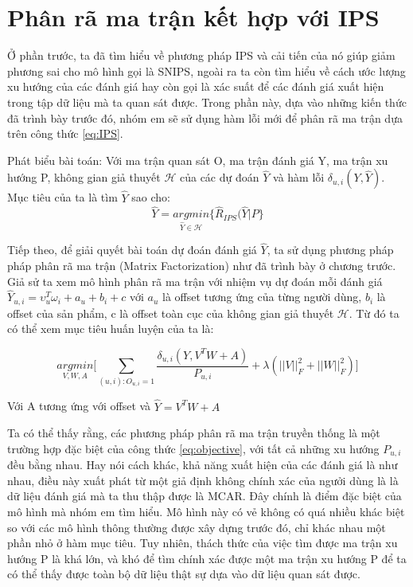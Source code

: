 \section{Phân rã ma trận kết hợp với IPS}
Ở phần trước, ta đã tìm hiểu về phương pháp IPS và cải tiến của nó giúp giảm phương sai cho mô hình gọi là SNIPS, ngoài ra ta còn tìm hiểu về cách ước lượng xu hướng của các đánh giá hay còn gọi là xác suất để các đánh giá xuất hiện trong tập dữ liệu mà ta quan sát được. Trong phần này, dựa vào những kiến thức đã trình bày trước đó, nhóm em sẽ sử dụng hàm lỗi mới để phân rã ma trận dựa trên công thức \ref{eq:IPS}. 

Phát biểu bài toán: Với ma trận quan sát O, ma trận đánh giá Y, ma trận xu hướng P, không gian giả thuyết $\mathcal{H}$ của các dự đoán $\hat{Y}$ và hàm lỗi $\delta_{u,i}(Y, \hat{Y})$. Mục tiêu của ta là tìm $\hat{Y}$ sao cho:
\begin{equation}
    \label{eq:ERM}
    \hat{Y} = \underset{\hat{Y} \in \mathcal{H}}{argmin}\bigg\{\hat{R}_{IPS}(\hat{Y}|P\bigg\}
\end{equation}

Tiếp theo, để giải quyết bài toán dự đoán đánh giá $\hat{Y}$, ta sử dụng phương pháp pháp phân rã ma trận (Matrix Factorization) như đã trình bày ở chương trước. Giả sử ta xem mô hình phân rã ma trận với nhiệm vụ dự đoán mỗi đánh giá $\hat{Y}_{u,i} = \upsilon_u^T \omega_i + a_u + b_i + c$ với $a_u$ là  offset tương ứng của từng người dùng, $b_i$ là offset của sản phẩm, c là offset toàn cục của không gian giả thuyết $\mathcal{H}$. Từ đó ta có thể xem mục tiêu huấn luyện của ta là:

\begin{equation}
    \label{eq:objective}
    \underset{V,W,A}{argmin} \bigg[ \sum_{(u,i):O_{u,i}=1} \frac{\delta_{u,i}(Y,V^TW + A)}{P_{u,i}} + \lambda(||V||_{F}^2 + ||W||_{F}^2) \Bigg]
\end{equation}

Với A tương ứng với offset và $\hat{Y} = V^TW + A$ 

Ta có thể thấy rằng, các phương pháp phân rã ma trận truyền thống là một trường hợp đặc biệt của công thức \ref{eq:objective}, với tất cả những xu hướng $P_{u,i}$ đều bằng nhau. Hay nói cách khác, khả năng xuất hiện của các đánh giá là như nhau, điều này xuất phát từ một giả định không chính xác của ngưởi dùng là là dữ liệu đánh giá mà ta thu thập được là MCAR. Đây chính là điểm đặc biệt của mô hình mà nhóm em tìm hiểu. Mô hình này có vẻ không có quá nhiều khác biệt so với các mô hình thông thường được xây dựng trước đó, chỉ khác nhau một phần nhỏ ở hàm mục tiêu. Tuy nhiên, thách thức của việc tìm được ma trận xu hướng P là khá lớn, và khó để tìm chính xác được một ma trận xu hướng P để ta có thể thấy được toàn bộ dữ liệu thật sự dựa vào dữ liệu quan sát được. 